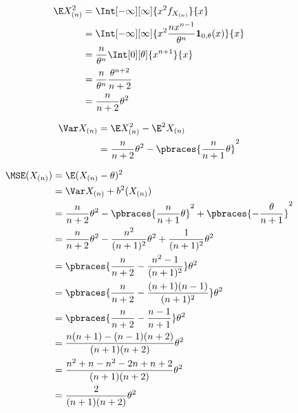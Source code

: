 \begin{solution}
\begin{enumerate}[label = (\alph*)]
\begin{enumerate}[label = \arabic*.]
        \begin{align*}
            \E X_{(n)}^2
            & =
            \Int[-\infty][\infty]
            {
                x^2 f_{X_{(n)}}
            }{x} \\
            & =
            \Int[-\infty][\infty]
            {
                x^2 \frac{n x^{n-1}}{\theta^n} \mathbf 1_{0, \theta}(x)
            }{x} \\
            & =
            \frac{n}{\theta^n}
            \Int[0][\theta]
            {
                x^{n+1}
            }{x} \\
            & =
            \frac{n}{\theta^n}
            \frac{\theta^{n+2}}{n+2} \\
            & =
            \frac{n}{n+2} \theta^2
        \end{align*}

        \begin{align*}
            \Var X_{(n)}
            & =
            \E X_{(n)}^2 - \E^2 X_{(n)} \\
            & =
            \frac{n}{n+2} \theta^2 - \pbraces{\frac{n}{n+1} \theta}^2
        \end{align*}

        \begin{align*}
            \MSE(X_{(n)})
            & =
            \E (X_{(n)} - \theta)^2 \\
            & =
            \Var X_{(n)} + b^2(X_{(n)}) \\
            & =
            \frac{n}{n+2} \theta^2 - \pbraces{\frac{n}{n+1} \theta}^2
            +
            \pbraces
            {
                -\frac{\theta}{n+1}
            }^2 \\
            & =
            \frac{n}{n + 2} \theta^2
            -
            \frac{n^2}{(n + 1)^2} \theta^2
            +
            \frac{1}{(n + 1)^2} \theta^2 \\
            & =
            \pbraces
            {
                \frac{n}{n + 2} - \frac{n^2 - 1}{(n + 1)^2}
            }
            \theta^2 \\
            & =
            \pbraces
            {
                \frac{n}{n + 2}
                -
                \frac{(n + 1) (n - 1)}{(n + 1)^2}
            }
            \theta^2 \\
            & =
            \pbraces
            {
                \frac{n}{n + 2}
                -
                \frac{n - 1}{n + 1}
            }
            \theta^2 \\
            & =
            \frac{n (n + 1) - (n - 1) (n + 2)}{(n + 1) (n + 2)} \theta^2 \\
            & =
            \frac{n^2 + n - n^2 - 2 n + n + 2}{(n + 1) (n + 2)} \theta^2 \\
            & =
            \frac{2}{(n + 1) (n + 2)} \theta^2
        \end{align*}


\end{enumerate}
\end{enumerate}
\end{solution}
